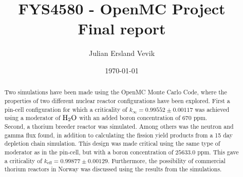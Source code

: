 \documentclass[norsk,a4paper,12pt]{article}
\title{FYS4580 - OpenMC Project \\
\Large Final report}
\author{Julian Ersland Vevik}
\date{\today}
\begin{document}
\maketitle


\begin{abstract}
Two simulations have been made using the OpenMC Monte Carlo Code, where the properties of two different nuclear reactor configurations have been explored. First a pin-cell configuration for which a criticality of $k_{\infty} = 0.99552 \pm 0.00117$ was achieved using a moderator of $\ce{H_2O}$ with an added boron concentration of $670$ ppm. 
\\
Second, a thorium breeder reactor was simulated. Among others was the neutron and gamma flux found, in addition to calculating the fission yield products from a 15 day depletion chain simulation. This design was made critical using the same type of moderator as in the pin-cell, but with a boron concentration of $25633.0$ ppm. This gave a criticality of $k_{\text{eff}} = 0.99877 \pm 0.00129$. Furthermore, the possibility of commercial thorium reactors in Norway was discussed using the results from the simulations.
\end{abstract}
\end{document}
